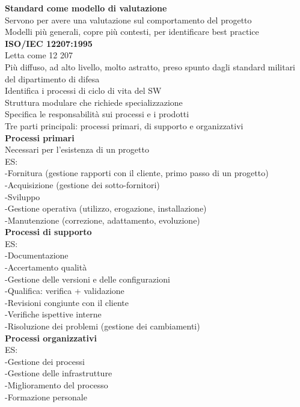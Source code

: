 \documentclass{article}
\begin{document}
		\textbf{Standard come modello di valutazione}\\
		Servono per avere una valutazione sul comportamento del progetto\\
		Modelli più generali, copre più contesti, per identificare best practice\\
	
		\textbf{ISO/IEC 12207:1995}\\
		Letta come 12 207\\
		Più diffuso, ad alto livello, molto astratto, preso spunto dagli standard militari del dipartimento di difesa\\
		Identifica i processi di ciclo di vita del SW\\
		Struttura modulare che richiede specializzazione\\
		Specifica le responsabilità sui processi e i prodotti\\
		Tre parti principali: processi primari, di supporto e organizzativi\\
	
		\textbf{Processi primari}\\
		Necessari per l'esistenza di un progetto\\
		ES:\\
		-Fornitura (gestione rapporti con il cliente, primo passo di un progetto)\\
		-Acquisizione (gestione dei sotto-fornitori)\\
		-Sviluppo\\
		-Gestione operativa (utilizzo, erogazione, installazione)\\
		-Manutenzione (correzione, adattamento, evoluzione)\\
		
		\textbf{Processi di supporto}\\
		ES:\\
		-Documentazione\\
		-Accertamento qualità\\
		-Gestione delle versioni e delle configurazioni\\
		-Qualifica: verifica + validazione\\
		-Revisioni congiunte con il cliente\\
		-Verifiche ispettive interne\\
		-Risoluzione dei problemi (gestione dei cambiamenti)\\
		
		\textbf{Processi organizzativi}\\
		ES:\\
		-Gestione dei processi\\
		-Gestione delle infrastrutture\\
		-Miglioramento del processo\\
		-Formazione personale\\
		
\end{document}
